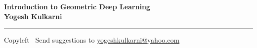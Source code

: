 
\graphicspath{{images/}}

\footnotesize


\begin{center}
\Large{\textbf{Introduction to Geometric Deep Learning\\ Yogesh Kulkarni}}  
\end{center}

\begin{multicols}{2}
% 

\end{multicols}

\rule{\linewidth}{0.25pt}
\scriptsize
Copyleft \textcopyleft\  Send suggestions to 
\href{http://www.yogeshkulkarni.com}{yogeshkulkarni@yahoo.com}


